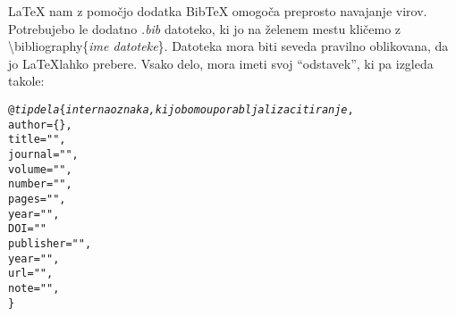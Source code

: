 \documentclass[10p, a4paper, twopage]{book}
\begin{document}
\LaTeX{} nam z pomočjo dodatka Bib\TeX{} omogoča preprosto navajanje virov. Potrebujebo le dodatno \textit{.bib} datoteko, ki jo na želenem mestu kličemo z \textbackslash{}bibliography\{\textit{ime datoteke}\}. Datoteka mora biti seveda pravilno oblikovana, da jo \LaTeX lahko prebere.
Vsako delo, mora imeti svoj ``odstavek'', ki pa izgleda takole:

\begin{alltt}

@\textit{tip dela} \{ \textit{interna oznaka, ki jo bomo uporabljali za citiranje},
  author = \{\},
  title = "",
  journal = "",
  volume = "",
  number = "",
  pages = "",
  year = "",
  DOI = ""
  publisher = "",
  year = "",
  url = "",
  note = "",
\}

\end{alltt}


\end{document}
